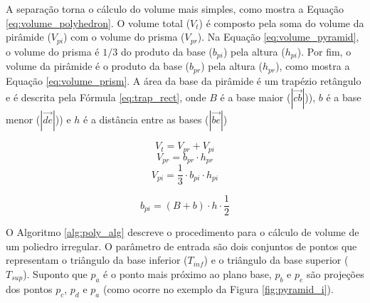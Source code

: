 A separação torna o cálculo do volume mais simples, como mostra a Equação \ref{eq:volume_polyhedron}. 
O volume total ($V_t$) é composto pela soma do volume da pirâmide ($V_{pi}$) com o volume do prisma ($V_{pr}$).
Na Equação \ref{eq:volume_pyramid}, o volume do prisma é $1/3$ do produto da base ($b_{pi}$) pela altura ($h_{pi}$). 
Por fim, o volume da pirâmide é o produto da base ($b_{pr}$) pela altura  ($h_{pr}$), como mostra a Equação \ref{eq:volume_prism}.
A área da base da pirâmide é um trapézio retângulo e é descrita pela Fórmula \ref{eq:trap_rect}, onde $B$ é a base maior ($\left | \overrightarrow{cb} \right |$)), $b$ é a base menor ($\left | \overrightarrow{de} \right |$)) e $h$ é a distância entre as bases ($\left | \overrightarrow{be} \right |$)


\begin{multicols}{3}
    \begin{equation}
        \label{eq:volume_polyhedron}
        V_t = V_{pr} + V_{pi}
    \end{equation}
    \begin{equation}
        \label{eq:volume_pyramid}
        V_{pr} = b_{pr} \cdot h_{pr}
    \end{equation}
    \begin{equation}
        \label{eq:volume_prism}
        V_{pi} = \frac{1}{3} \cdot b_{pi} \cdot h_{pi}
    \end{equation}
\end{multicols}

\begin{equation}
    \label{eq:trap_rect}
    b_{pi} = (B+b) \cdot h \cdot \frac{1}{2}
\end{equation}
\vspace{0.5em}

\iffalse
O Algoritmo \ref{alg:poly_alg} descreve o procedimento para o cálculo de volume de um poliedro irregular. 
O parâmetro de entrada são dois conjuntos de pontos que representam o triângulo da base inferior ($T_{inf}$) e o triângulo da base superior ($T_{sup}$).
Suponto que $p_a$ é o ponto mais próximo ao plano base, $p_b$ e $p_e$ são projeções dos pontos $p_c$, $p_d$ e $p_a$ (como ocorre no exemplo da Figura \ref{fig:pyramid_i}).

